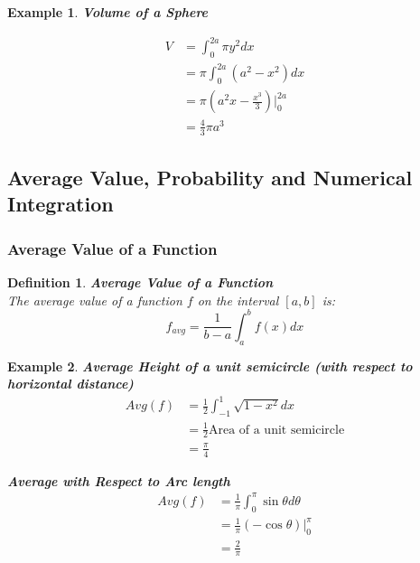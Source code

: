 \documentclass[10pt, a4paper]{article}
\newtheorem{definition}{Definition}
\newtheorem{example}{Example}
\begin{document}
\begin{example}
    \textbf{Volume of a Sphere}
    \begin{center}
    \end{center}
    \begin{align*}
        V &= \int_{0}^{2a} \pi y^2dx \\
        &= \pi\int_{0}^{2a} (a^2 - x^2)dx \\
        &= \pi\left(a^2x - \frac{x^3}{3}\right)\Big|_{0}^{2a} \\
        &= \frac{4}{3}\pi a^3
    \end{align*}
\end{example}

\subsection{Average Value, Probability and Numerical Integration}
\subsubsection*{Average Value of a Function}
\begin{definition}
    \textbf{Average Value of a Function} \\
    The average value of a function $f$ on the interval $[a, b]$ is:
    \[\boxed{f_{avg} = \frac{1}{b-a}\int_a^b f(x)dx}\]
\end{definition}

\begin{example}
    \textbf{Average Height of a unit semicircle (with respect to horizontal distance)} \\
    \begin{align*}
        Avg(f) &= \frac{1}{2}\int_{-1}^{1}\sqrt{1-x^2}dx \\
        &= \frac{1}{2}\text{Area of a unit semicircle} \\
        &= \frac{\pi}{4}
    \end{align*}

    \textbf{Average with Respect to Arc length} \\    
    \begin{align*}
        Avg(f) &= \frac{1}{\pi}\int_{0}^{\pi}\sin \theta d\theta \\
        &= \frac{1}{\pi}\left(-\cos \theta\right)\Big|_{0}^{\pi} \\
        &= \frac{2}{\pi}
    \end{align*}
    
\end{example}
\end{document}
